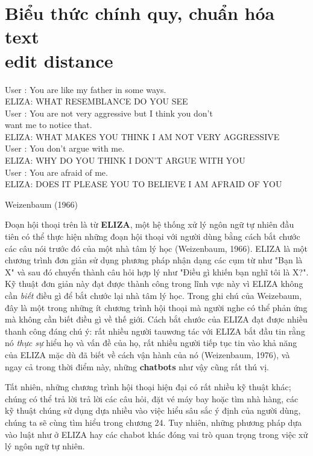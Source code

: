 \setcounter{chapter}{1}

\chapter{Biểu thức chính quy, chuẩn hóa text\\edit distance}
\setlength\epigraphwidth{\textwidth}
\epigraphfontsize{\small}
\epigraph{
{\selectfont
User : You are like my father in some ways. \\
ELIZA: WHAT RESEMBLANCE DO YOU SEE \\
User : You are not very aggressive but I think you don’t \\
\hspace{38pt} want me to notice that. \\
ELIZA: WHAT MAKES YOU THINK I AM NOT VERY AGGRESSIVE \\
User : You don’t argue with me. \\
ELIZA: WHY DO YOU THINK I DON’T ARGUE WITH YOU \\
User : You are afraid of me. \\
ELIZA: DOES IT PLEASE YOU TO BELIEVE I AM AFRAID OF YOU\\
}
}{Weizenbaum (1966)}

Đoạn hội thoại trên là từ \textbf{ELIZA}, một hệ thống xử lý ngôn ngữ tự nhiên đầu tiên có thể thực hiện những đoạn hội thoại với người dùng bằng cách bắt chước các câu nói trước đó của một nhà tâm lý học (Weizenbaum, 1966). ELIZA là một chương trình đơn giản sử dụng phương pháp nhận dạng các cụm từ như "Bạn là X" và sau đó chuyển thành câu hỏi hợp lý như "Điều gì khiến bạn nghĩ tôi là X?". Kỹ thuật đơn giản này đạt được thành công trong lĩnh vực này vì ELIZA không cần \textit{biết} điều gì để bắt chước lại nhà tâm lý học. Trong ghi chú của Weizebaum, đây là một trong những ít chương trình hội thoại mà người nghe có thể phản ứng mà không cần biết điều gì về thế giới. Cách bắt chước của ELIZA đạt được nhiều thanh công đáng chú ý: rất nhiều người tauwơng tác với ELIZA bắt đầu tin rằng nó \textit{thực sự} hiểu họ và vấn đề của họ, rất nhiều người tiếp tục tin vào khả năng của ELIZA mặc dù đã biết về cách vận hành của nó (Weizenbaum, 1976), và ngay cả trong thời điểm này, những \textbf{chatbots} như vậy cũng rất thú vị.

Tất nhiên, những chương trình hội thoại hiện đại có rất nhiều kỹ thuật khác; chúng có thể trả lời trả lời các câu hỏi, đặt vé máy bay hoặc tìm nhà hàng, các kỹ thuật chúng sử dụng dựa nhiều vào việc hiểu sâu sắc ý định của người dùng, chúng ta sẽ cùng tìm hiểu trong chương 24. Tuy nhiên, những phương pháp dựa vào luật như ở ELIZA hay các chabot khác đóng vai trò quan trọng trong việc xử lý ngôn ngữ tự nhiên.

